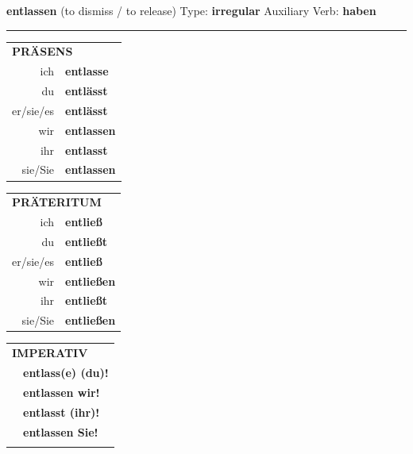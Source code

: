 \documentclass[10pt,a4paper]{revtex4-2}
\begin{document}
\begin{verbbox}
    {\Large \bf entlassen} (to dismiss / to release) \hfill Type: \textbf{irregular} \hfill Auxiliary Verb: \textbf{haben} 
    
     \vspace{5pt}

    \hrule
    
    \vspace{5pt}

  \begin{tabular}{rl}
     \multicolumn{2}{l}{\textbf{PRÄSENS} }\\
    ich & \textbf{entlasse}\\
    du & \textbf{entlässt}\\
    er/sie/es & \textbf{entlässt}\\
    wir & \textbf{entlassen}\\
    ihr & \textbf{entlasst}\\
    sie/Sie & \textbf{entlassen}\\
  \end{tabular}
  \hfill
     \begin{tabular}{rl}
    \multicolumn{2}{l}{\textbf{PRÄTERITUM} }\\
    ich & \textbf{entließ}\\
    du & \textbf{entließt}\\
    er/sie/es & \textbf{entließ}\\
    wir & \textbf{entließen}\\
    ihr & \textbf{entließt}\\
    sie/Sie & \textbf{entließen}\\
  \end{tabular}
  \hfill
  \begin{tabular}{rl}
     \multicolumn{2}{l}{\textbf{IMPERATIV} }\\
   & \textbf{entlass(e) (du)!}\\
   & \textbf{entlassen wir!}\\
   & \textbf{entlasst (ihr)!}\\
   & \textbf{entlassen Sie!}\\
   & \vspace{10pt}
  \end{tabular}

    \vspace{10pt}


\end{verbbox}
\end{document}
